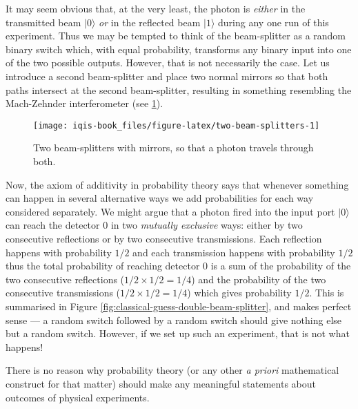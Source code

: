 \documentclass[fleqn]{article}
\newenvironment{idea}{\noindent}{\medskip}
\begin{document}
It may seem obvious that, at the very least, the photon is \emph{either} in the transmitted beam \(|0\rangle\) \emph{or} in the reflected beam \(|1\rangle\) during any one run of this experiment.
Thus we may be tempted to think of the beam-splitter as a random binary switch which, with equal probability, transforms any binary input into one of the two possible outputs.
However, that is not necessarily the case.
Let us introduce a second beam-splitter and place two normal mirrors so that both paths intersect at the second beam-splitter, resulting in something resembling the Mach-Zehnder interferometer (see \ref{fig:two-beam-splitters}).

\begin{figure}[H]

{\centering \texttt{[image: iqis-book\_files/figure-latex/two-beam-splitters-1]} 

}

\caption{Two beam-splitters with mirrors, so that a photon travels through both.}\label{fig:two-beam-splitters}
\end{figure}

Now, the axiom of additivity in probability theory says that whenever something can happen in several alternative ways we add probabilities for each way considered separately.
We might argue that a photon fired into the input port \(|0\rangle\) can reach the detector \(0\) in two \emph{mutually exclusive} ways: either by two consecutive reflections or by two consecutive transmissions.
Each reflection happens with probability \(1/2\) and each transmission happens with probability \(1/2\) thus the total probability of reaching detector 0 is a sum of the probability of the two consecutive reflections (\(1/2\times 1/2 = 1/4\)) and the probability of the two consecutive transmissions (\(1/2\times 1/2 = 1/4\)) which gives probability \(1/2\).
This is summarised in Figure \ref{fig:classical-guess-double-beam-splitter}, and makes perfect sense --- a random switch followed by a random switch should give nothing else but a random switch.
However, if we set up such an experiment, that is not what happens!

\begin{idea}
There is no reason why probability theory (or any other \emph{a priori} mathematical construct for that matter) should make any meaningful statements about outcomes of physical experiments.

\end{idea}
\end{document}
